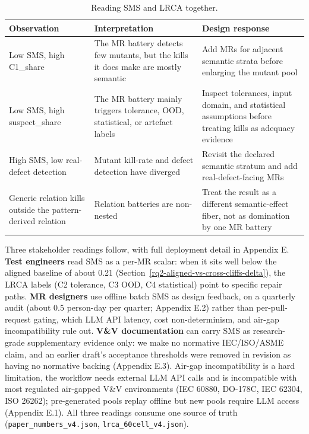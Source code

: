 \documentclass[manuscript,screen,review]{acmart}
\begin{document}
{%
\begin{longtable}[]{@{}
  >{\raggedright\arraybackslash}p{}
  >{\raggedright\arraybackslash}p{}
  >{\raggedright\arraybackslash}p{}@{}}
\caption{Reading SMS and LRCA together.}\label{tab:sms-lrca-reading}\\
\toprule\noalign{}
Observation & Interpretation & Design response \\
\midrule\noalign{}
\endfirsthead
\endhead
\bottomrule\noalign{}
\endlastfoot
Low SMS, high C1\_share & The MR battery detects few mutants, but the
kills it does make are mostly semantic & Add MRs for adjacent semantic
strata before enlarging the mutant pool \\
Low SMS, high suspect\_share & The MR battery mainly triggers tolerance,
OOD, statistical, or artefact labels & Inspect tolerances, input domain,
and statistical assumptions before treating kills as adequacy evidence \\
High SMS, low real-defect detection & Mutant kill-rate and defect
detection have diverged & Revisit the declared semantic stratum and add
real-defect-facing MRs \\
Generic relation kills outside the pattern-derived relation & Relation
batteries are non-nested & Treat the result as a different
semantic-effect fiber, not as domination by one MR battery \\
\end{longtable}
}

Three stakeholder readings follow, with full deployment detail in Appendix E.
\textbf{Test engineers} read SMS as a per-MR scalar: when it sits well below
the aligned baseline of about 0.21 (Section~\ref{rq2-aligned-vs-cross-cliffs-delta}),
the LRCA labels (C2 tolerance, C3 OOD, C4 statistical) point to specific repair
paths. \textbf{MR designers} use offline batch SMS as design feedback, on a
quarterly audit (about 0.5 person-day per quarter; Appendix E.2) rather than
per-pull-request gating, which LLM API latency, cost non-determinism, and
air-gap incompatibility rule out. \textbf{V\&V documentation} can carry SMS as
research-grade supplementary evidence only: we make no normative IEC/ISO/ASME
claim, and an earlier draft's acceptance thresholds were removed in revision as
having no normative backing (Appendix E.3). Air-gap incompatibility is a hard
limitation, the workflow needs external LLM API calls and is incompatible with
most regulated air-gapped V\&V environments (IEC 60880, DO-178C, IEC 62304,
ISO 26262); pre-generated pools replay offline but new pools require LLM access
(Appendix E.1). All three readings consume one source of truth
(\texttt{paper\_numbers\_v4.json}, \texttt{lrca\_60cell\_v4.json}).
\end{document}
